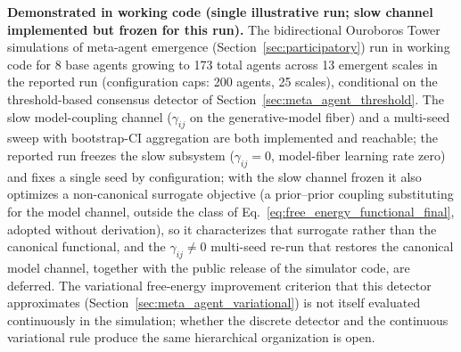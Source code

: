 \documentclass[11pt]{article}
\begin{document}
\textbf{Demonstrated in working code (single illustrative run; slow channel implemented but frozen for this run).} The bidirectional Ouroboros Tower simulations of meta-agent emergence (Section~\ref{sec:participatory}) run in working code for 8 base agents growing to 173 total agents across 13 emergent scales in the reported run (configuration caps: 200 agents, 25 scales), conditional on the threshold-based consensus detector of Section~\ref{sec:meta_agent_threshold}. The slow model-coupling channel ($\gamma_{ij}$ on the generative-model fiber) and a multi-seed sweep with bootstrap-CI aggregation are both implemented and reachable; the reported run freezes the slow subsystem ($\gamma_{ij} = 0$, model-fiber learning rate zero) and fixes a single seed by configuration; with the slow channel frozen it also optimizes a non-canonical surrogate objective (a prior--prior coupling substituting for the model channel, outside the class of Eq.~\eqref{eq:free_energy_functional_final}, adopted without derivation), so it characterizes that surrogate rather than the canonical functional, and the $\gamma_{ij} \neq 0$ multi-seed re-run that restores the canonical model channel, together with the public release of the simulator code, are deferred. The variational free-energy improvement criterion that this detector approximates (Section~\ref{sec:meta_agent_variational}) is not itself evaluated continuously in the simulation; whether the discrete detector and the continuous variational rule produce the same hierarchical organization is open.
\end{document}
